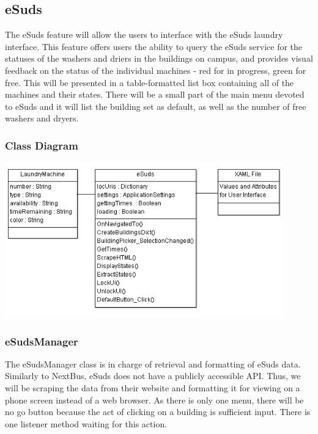 \documentclass[pdftex,12pt,letter]{article}
\begin{document}
\subsection{eSuds}
The eSuds feature will allow the users to interface with the eSuds laundry interface. This feature offers users the ability to query the eSuds service for the statuses of the washers and driers in the buildings on campus, and provides visual feedback on the status of the individual machines - red for in progress, green for free. This will be presented in a table-formatted list box containing all of the machines and their states. There will be a small part of the main menu devoted to eSuds and it will list the building set as default, as well as the number of free washers and dryers.
\subsubsection{Class Diagram}
\begin{flushleft}
\includegraphics[width=120mm]{eSuds.png}
\end{flushleft}
\subsubsection{eSudsManager}
The eSudsManager class is in charge of retrieval and formatting of eSuds data. Similarly to NextBus, eSuds does not have a publicly accessible API. Thus, we will be scraping the data from their website and formatting it for viewing on a phone screen instead of a web browser. As there is only one menu, there will be no go button because the act of clicking on a building is sufficient input. There is one listener method waiting for this action.
\end{document}
